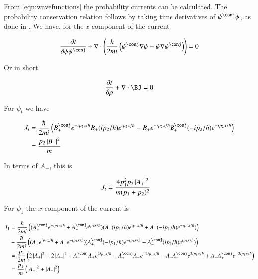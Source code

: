 \documentclass{article}
\begin{document}
From \ref{eqn:wavefunctions}
the probability currents can be calculated.  The probability
conservation relation follows by taking time derivatives of $\psi^\conj\psi$, as done in \cite{PJprobCurrent}.  We have, for the $x$ component of the current

\begin{align*}
\PD{t}{\psi\psi^\conj} + \grad \cdot \left(
\frac{\hbar}{2 m i}
\left(
\psi^\conj \grad \psi
-\psi \grad \psi^\conj
\right)
\right) = 0
\end{align*}

Or in short

\begin{align*}
\PD{t}{\rho} + \grad \cdot \BJ = 0
\end{align*}

For $\psi_t$ we have

\begin{align*}
J_t
&=
\frac{\hbar}{2 m i}
\left(
B_{+}^\conj e^{ -i p_2 x/\hbar }
B_{+} (i p_2 /\hbar)e^{ i p_2 x/\hbar }
-B_{+} e^{ -i p_2 x/\hbar }
B_{+}^\conj (-i p_2 /\hbar)e^{ -i p_2 x/\hbar }
\right) \\
&= \frac{ p_2 \Abs{ B_{+} }^2}{m } \\
\end{align*}

In terms of $A_{+}$, this is

\begin{align}\label{eqn:currentTransmitted}
J_t &= \frac{ 4 p_1^2 p_2 \left\lvert{ A_{+} }\right\rvert^2}{m (p_1 + p_2)^2}
\end{align}

For $\psi_1$ the $x$ component of the current is

\begin{align*}
J_1
&=
\frac{\hbar}{2 m i}
\left(
(A_{+}^\conj e^{ -i p_1 x/\hbar }
+A_{-}^\conj e^{ i p_1 x/\hbar })
(A_{+} (i p_1 /\hbar)e^{ i p_1 x/\hbar }
+A_{-} (-i p_1 /\hbar)e^{ -i p_1 x/\hbar })
\right)
\\
&
-
\frac{\hbar}{2 m i} \left(
(
A_{+} e^{ i p_1 x/\hbar } +A_{-} e^{ -i p_1 x/\hbar })
(A_{+}^\conj (-i p_1 /\hbar)e^{ -i p_1 x/\hbar }
+A_{-}^\conj (i p_1 /\hbar)e^{ i p_1 x/\hbar })
\right) \\
&=
\frac{p_1}{2m}
\left(
2\Abs{A_{+} }^2
+2\Abs{A_{-} }^2
+
A_{-}^\conj A_{+} e^{ 2 i p_1 x/\hbar }
-A_{+}^\conj A_{-} e^{ -2 i p_1 x/\hbar }
-A_{+} A_{-}^\conj e^{ 2 i p_1 x/\hbar }
+A_{-} A_{+}^\conj e^{ -2 i p_1 x/\hbar }
\right) \\
&=
\frac{p_1}{m}
\left(
\Abs{A_{+} }^2
+\Abs{A_{-} }^2
\right) \\
\end{align*}
\end{document}
